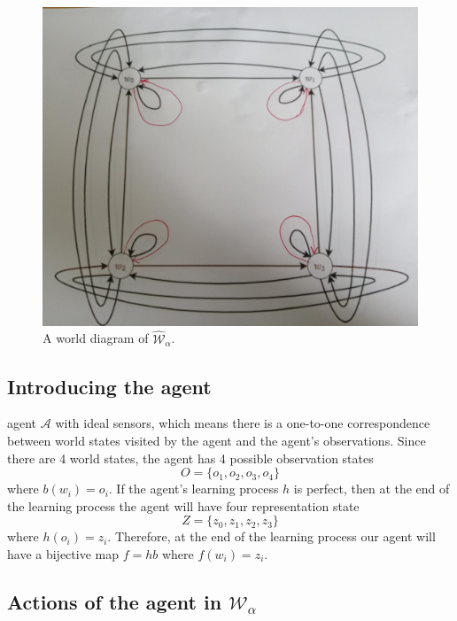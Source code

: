\begin{figure}[H]
    \centering
    \includegraphics[width=0.5\linewidth]{2MathematicalFramework/Images/2x2_cyclical_minimum_transformations.jpeg}
    \caption{
    A world diagram of $\hat{\mathscr{W}}_{\alpha}$.
    }
    \label{fig:2x2_cyclical_minimum_transformations}
\end{figure}

\subsection{Introducing the agent}

 agent $\mathscr{A}$ with ideal sensors, which means there is a one-to-one correspondence between world states visited by the agent and the agent's observations.
Since there are 4 world states, the agent has 4 possible observation states
\begin{equation}
    O = \{ o_{1}, o_{2}, o_{3}, o_{4} \}
\end{equation}
where $b(w_{i}) = o_{i}$.
If the agent's learning process $h$ is perfect, then at the end of the learning process the agent will have four representation state
\begin{equation}
    Z = \{ z_{0}, z_{1}, z_{2}, z_{3} \}
\end{equation}
where $h(o_{i}) = z_{i}$.
Therefore, at the end of the learning process our agent will have a bijective map $f = hb$ where $f(w_{i}) = z_{i}$.

\subsection{
Actions of the agent in $\mathscr{W}_{\alpha}$
}\label{sec:Actions of the agent in example}

